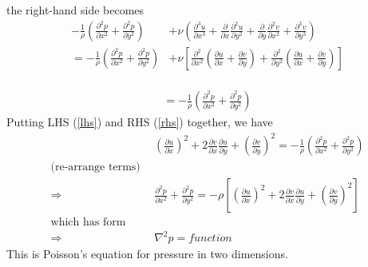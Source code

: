 \documentclass[11pt]{article}
\newcommand{\D}[2][]{\frac{\partial#1}{\partial#2}}
\begin{document}
the right-hand side becomes
\begin{align}
-\frac{1}{\rho} \left( \D[^2p]{x^2} + \D[^2p]{y^2} \right)
&+\nu \left( \D[^3u]{x^3} + \D{x} \D[^2u]{y^2} + \D{y} \D[^2v]{x^2} + \D[^3v]{y^3} \right)
	\nonumber \\ \nonumber
= -\frac{1}{\rho} \left( \D[^2p]{x^2} + \D[^2p]{y^2} \right)
&+ \nu \left[
  \D[^2]{x^2} \left( \D[u]{x} + \D[v]{y} \right)
+ \D[^2]{y^2} \left( \D[u]{x} + \D[v]{y} \right)
  \right]
  \label{rhs}
\end{align}
  \\
\begin{align}
= -\frac{1}{\rho} \left( \D[^2p]{x^2} + \D[^2p]{y^2} \right)
\end{align}
Putting LHS (\ref{lhs}) and RHS (\ref{rhs}) together, we have
\begin{align}
&\left(\D[u]{x}\right)^2 + 2\D[v]{x}\D[u]{y} + \left(\D[v]{y}\right)^2
=
-\frac{1}{\rho} \left( \D[^2p]{x^2} + \D[^2p]{y^2} \right)
\nonumber \\
\text{(re-arrange terms)}~~ \nonumber \\
\Rightarrow~~~&\D[^2p]{x^2} + \D[^2p]{y^2} =
- \rho \left[ \left(\D[u]{x}\right)^2 + 2\D[v]{x}\D[u]{y} + \left(\D[v]{y}\right)^2 \right]
\label{poisson_continuous_2-component} \\
\text{which has form}& \nonumber \\ \nonumber
\Rightarrow~~~&\nabla^2 p = function
\end{align}
This is Poisson's equation for pressure in two dimensions.
\end{document}
